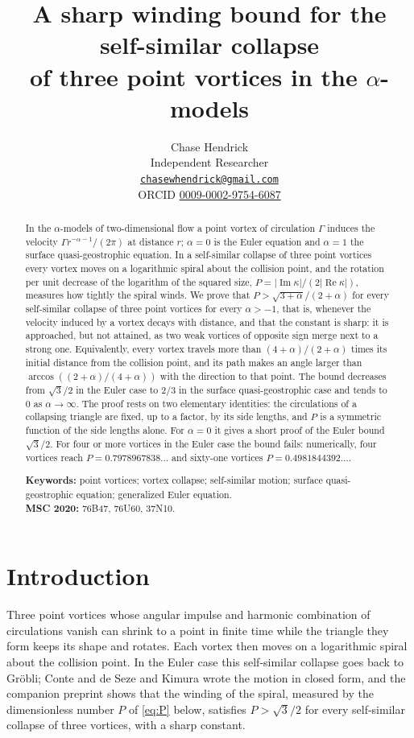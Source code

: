 \documentclass[11pt]{article}
\title{\Large\bfseries A sharp winding bound for the self-similar collapse\\
  of three point vortices in the $\alpha$-models}
\author{Chase Hendrick\\[0.2em] {\small Independent Researcher}\\ {\small\href{mailto:chasewhendrick@gmail.com}{\texttt{chasewhendrick@gmail.com}}}\\ {\small ORCID \href{https://orcid.org/0009-0002-9754-6087}{0009-0002-9754-6087}}}
\date{}
\theoremstyle{definition}
\newcommand{\re}{\operatorname{Re}}
\newcommand{\im}{\operatorname{Im}}
\begin{document}
\maketitle

\begin{abstract}
In the $\alpha$-models of two-dimensional flow a point vortex of circulation $\Gamma$ induces the velocity $\Gamma r^{-\alpha-1}/(2\pi)$ at distance $r$; $\alpha = 0$ is the Euler equation and $\alpha = 1$ the surface quasi-geostrophic equation. In a self-similar collapse of three point vortices every vortex moves on a logarithmic spiral about the collision point, and the rotation per unit decrease of the logarithm of the squared size, $P = |\im\kappa|/(2|\re\kappa|)$, measures how tightly the spiral winds. We prove that $P > \sqrt{3+\alpha}/(2+\alpha)$ for every self-similar collapse of three point vortices for every $\alpha > -1$, that is, whenever the velocity induced by a vortex decays with distance, and that the constant is sharp: it is approached, but not attained, as two weak vortices of opposite sign merge next to a strong one. Equivalently, every vortex travels more than $(4+\alpha)/(2+\alpha)$ times its initial distance from the collision point, and its path makes an angle larger than $\arccos((2+\alpha)/(4+\alpha))$ with the direction to that point. The bound decreases from $\sqrt{3}/2$ in the Euler case to $2/3$ in the surface quasi-geostrophic case and tends to $0$ as $\alpha \to \infty$. The proof rests on two elementary identities: the circulations of a collapsing triangle are fixed, up to a factor, by its side lengths, and $P$ is a symmetric function of the side lengths alone. For $\alpha = 0$ it gives a short proof of the Euler bound $\sqrt{3}/2$. For four or more vortices in the Euler case the bound fails: numerically, four vortices reach $P = 0.7978967838\ldots$ and sixty-one vortices $P = 0.4981844392\ldots$.

\medskip
\noindent\textbf{Keywords:} point vortices; vortex collapse; self-similar motion; surface quasi-geostrophic equation; generalized Euler equation.\\
\textbf{MSC 2020:} 76B47, 76U60, 37N10.
\end{abstract}

\section{Introduction}

Three point vortices whose angular impulse and harmonic combination of circulations vanish can shrink to a point in finite time while the triangle they form keeps its shape and rotates. Each vortex then moves on a logarithmic spiral about the collision point. In the Euler case this self-similar collapse goes back to Gr\"obli; Conte and de Seze \cite{cds1980} and Kimura \cite{kimura1987} wrote the motion in closed form, and the companion preprint \cite{hendrick2026} shows that the winding of the spiral, measured by the dimensionless number $P$ of \eqref{eq:P} below, satisfies $P > \sqrt{3}/2$ for every self-similar collapse of three vortices, with a sharp constant.
\end{document}
